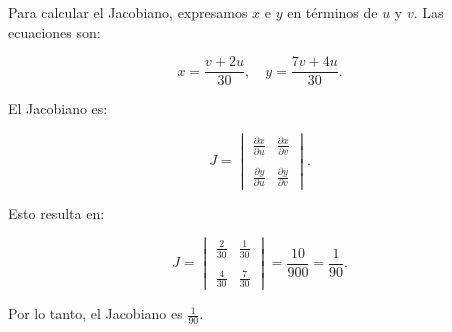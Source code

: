 Para calcular el Jacobiano, expresamos \(x\) e \(y\) en términos de \(u\) y \(v\). Las ecuaciones son:

\[
x = \frac{v + 2u}{30}, \quad y = \frac{7v + 4u}{30}.
\]

El Jacobiano es:

\[
J = 
\begin{vmatrix}
\frac{\partial x}{\partial u} & \frac{\partial x}{\partial v} \\\\
\frac{\partial y}{\partial u} & \frac{\partial y}{\partial v}
\end{vmatrix}.
\]

Esto resulta en:

\[
J = 
\begin{vmatrix}
\frac{2}{30} & \frac{1}{30} \\\\
\frac{4}{30} & \frac{7}{30}
\end{vmatrix}
= \frac{10}{900} = \frac{1}{90}.
\]

Por lo tanto, el Jacobiano es \(\frac{1}{90}\).
